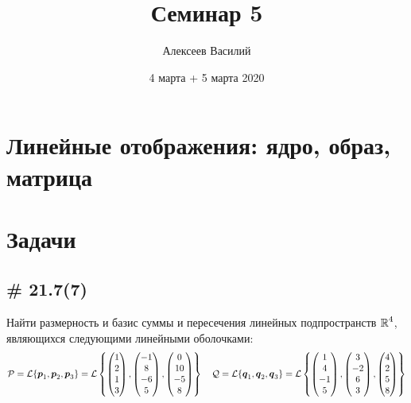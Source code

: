 \documentclass[a4paper,12pt]{article}
\author{Алексеев Василий}
\title{Семинар 5}
\date{4 марта + 5 марта 2020}
\begin{document}
  \maketitle
  
  \tableofcontents

  \thispagestyle{empty}
  
  \newpage
  


  \section{Линейные отображения: ядро, образ, матрица}
  
  \section{Задачи}
  
  
  \subsection{\# 21.7(7)}
  
  Найти размерность и базис суммы и пересечения линейных подпространств $\operatorname{\mathbb R}^4$, являющихся следующими линейными оболочками:
  \[
    \mathcal P = \mathcal L \{\boldsymbol p_1, \boldsymbol p_2, \boldsymbol p_3\} = \mathcal L \left\{
      \begin{pmatrix} 1 \\ 2 \\ 1 \\ 3 \end{pmatrix},
      \begin{pmatrix} -1 \\ 8 \\ -6 \\ 5 \end{pmatrix},
      \begin{pmatrix} 0 \\ 10 \\ -5 \\ 8 \end{pmatrix}
    \right\} \quad \mathcal Q = \mathcal L \{\boldsymbol q_1, \boldsymbol q_2, \boldsymbol q_3\} = \mathcal L \left\{
      \begin{pmatrix} 1 \\ 4 \\ -1 \\ 5 \end{pmatrix},
      \begin{pmatrix} 3 \\ -2 \\ 6 \\ 3 \end{pmatrix},
      \begin{pmatrix} 4 \\ 2 \\ 5 \\ 8 \end{pmatrix}
    \right\}
  \]
  
\end{document}
